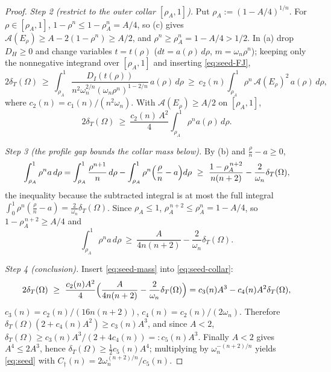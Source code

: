 \documentclass[11pt]{amsart}
\theoremstyle{definition}
\newcommand{\Om}{\Omega}
\newcommand{\Fr}{\mathcal A}
\newcommand{\dT}{\delta_T}
\begin{document}
\begin{proof}
\emph{Step 2 (restrict to the outer collar $[\rho_A,1]$).}
Put $\rho_A:=(1-A/4)^{1/n}$. For $\rho\in[\rho_A,1]$,
$1-\rho^n\le1-\rho_A^n=A/4$, so (c) gives
$\Fr(E_\rho)\ge A-2(1-\rho^n)\ge A/2$, and $\rho^n\ge\rho_A^n=1-A/4>1/2$.
In (a) drop $D_H\ge0$ and change variables $t=t(\rho)$
($dt=a(\rho)\,d\rho$, $m=\omega_n\rho^n$); keeping only the nonnegative
integrand over $[\rho_A,1]$ and inserting \eqref{eq:seed-FJ},
\[
   2\dT(\Om)\ \ge\
   \int_{\rho_A}^1\frac{D_I(t(\rho))}{n^2\omega_n^{2/n}(\omega_n\rho^n)^{1-2/n}}\,a(\rho)\,d\rho
   \ \ge\ c_2(n)\int_{\rho_A}^1\rho^n\,\Fr(E_\rho)^2\,a(\rho)\,d\rho,
\]
where $c_2(n)=c_1(n)/(n^2\omega_n)$.
With $\Fr(E_\rho)\ge A/2$ on $[\rho_A,1]$,
\begin{equation}\label{eq:seed-collar}
   2\dT(\Om)\ \ge\ \frac{c_2(n)\,A^2}{4}\int_{\rho_A}^1\rho^n a(\rho)\,d\rho .
\end{equation}

\emph{Step 3 (the profile gap bounds the collar mass below).}
By (b) and $\tfrac\rho n-a\ge0$,
\[
   \int_{\rho_A}^1\rho^n a\,d\rho
   =\int_{\rho_A}^1\frac{\rho^{n+1}}{n}\,d\rho
     -\int_{\rho_A}^1\rho^n\Bigl(\frac\rho n-a\Bigr)d\rho
   \ \ge\ \frac{1-\rho_A^{\,n+2}}{n(n+2)}-\frac2{\omega_n}\dT(\Om),
\]
the inequality because the subtracted integral is at most the full integral
$\int_0^1\rho^n(\tfrac\rho n-a)=\tfrac2{\omega_n}\dT(\Om)$. Since $\rho_A\le1$,
$\rho_A^{\,n+2}\le\rho_A^n=1-A/4$, so $1-\rho_A^{\,n+2}\ge A/4$ and
\begin{equation}\label{eq:seed-mass}
   \int_{\rho_A}^1\rho^n a\,d\rho\ \ge\ \frac{A}{4n(n+2)}-\frac2{\omega_n}\dT(\Om).
\end{equation}

\emph{Step 4 (conclusion).} Insert \eqref{eq:seed-mass} into
\eqref{eq:seed-collar}:
\[
   2\dT(\Om)\ \ge\ \frac{c_2(n)A^2}{4}
   \Bigl(\frac{A}{4n(n+2)}-\frac2{\omega_n}\dT(\Om)\Bigr)
   = c_3(n)A^3-c_4(n)A^2\dT(\Om),
\]
$c_3(n)=c_2(n)/(16n(n+2))$, $c_4(n)=c_2(n)/(2\omega_n)$. Therefore
$\dT(\Om)(2+c_4(n)A^2)\ge c_3(n)A^3$, and since $A<2$,
$\dT(\Om)\ge c_3(n)A^3/(2+4c_4(n))=:c_5(n)A^3$. Finally $A<2$ gives
$A^4\le2A^3$, hence $\dT(\Om)\ge\tfrac12 c_5(n)A^4$; multiplying by
$\omega_n^{-(n+2)/n}$ yields \eqref{eq:seed} with
$C_\dagger(n)=2\omega_n^{(n+2)/n}/c_5(n)$.
\end{proof}
\end{document}
